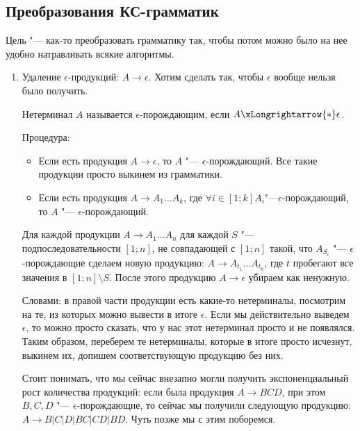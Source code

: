 
\subsection{Преобразования КС-грамматик}
Цель "--- как-то преобразовать грамматику так, чтобы потом можно было на нее удобно натравливать всякие алгоритмы.

\begin{enumerate}
\item
Удаление $\epsilon$-продукций: $A \to \epsilon$. Хотим сделать так, чтобы $\epsilon$ вообще нельзя было получить.

\begin{Def}
Нетерминал $A$ называется $\epsilon$-порождающим, если $A \xLongrightarrow{*} \epsilon$.

Процедура:
\begin{itemize}
\item
Если есть продукция $A \to \epsilon$, то $A$ "--- $\epsilon$-порождающий. Все такие продукции просто выкинем из грамматики.

\item
Если есть продукция $A \to A_1 \dots A_k$, где $\forall i \in [1; k] A_i$"---$\epsilon$-порождающий, то $A$ "--- $\epsilon$-порождающий.
\end{itemize}
\end{Def}

Для каждой продукции $A \to A_1 \dots A_n$ для каждой $S$ "--- подпоследовательности $[1; n]$, не совпадающей с $[1; n]$ такой, что $A_{S_i}$ "--- $\epsilon$-порождающие сделаем новую продукцию:
$A \to A_{t_1} \dots A_{t_k}$, где $t$ пробегают все значения в $[1; n] \setminus S$. После этого продукцию $A \to \epsilon$ убираем как ненужную.

Словами: в правой части продукции есть какие-то нетерминалы, посмотрим на те, из которых можно вывести в итоге $\epsilon$. 
Если мы действительно выведем $\epsilon$, то можно просто сказать, что у нас этот нетерминал просто и не появлялся. 
Таким образом, переберем те нетерминалы, которые в итоге просто исчезнут, выкинем их, допишем соответствующую продукцию без них.
\begin{Rem}
Стоит понимать, что мы сейчас внезапно могли получить экспоненциальный рост количества продукций: если была продукция $A \to BCD$, при этом $B, C, D$ "--- $\epsilon$-порождающие, то сейчас
мы получили следующую продукцию: $A \to B | C | D | BC | CD | BD$. 
Чуть позже мы с этим поборемся.
\end{Rem}


\end{enumerate}
